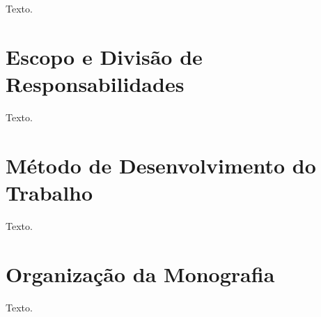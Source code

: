 Texto.


\section{Escopo e Divisão de Responsabilidades}
\label{sec-intro-escopo}

Texto.


\section{Método de Desenvolvimento do Trabalho}
\label{sec-intro-met}

Texto.


\section{Organização da Monografia}
\label{sec-intro-organizacao}

Texto.
